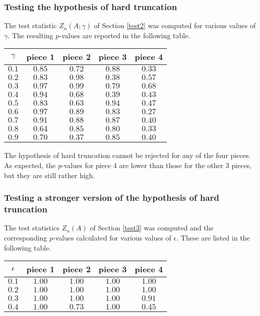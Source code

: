 \documentclass[11pt]{amsart}
\numberwithin{equation}{section}
\begin{document}
\subsubsection*{Testing the hypothesis of hard truncation}
The test statistic $Z_n(A;\gamma)$ of Section
\ref{test2}  was computed for various values of $\gamma$.
The resulting $p$-values are reported in the following table.
\begin{center}
\begin{tabular}{c|cccc}
$\gamma$&piece 1&piece 2&piece 3&piece 4\\
\hline
$0.1$&$0.85$&$0.72$&$0.88$&$0.33$\\
$0.2$&$0.83$&$0.98$&$0.38$&$0.57$\\
$0.3$&$0.97$&$0.99$&$0.79$&$0.68$\\
$0.4$&$0.94$&$0.68$&$0.39$&$0.43$\\
$0.5$&$0.83$&$0.63$&$0.94$&$0.47$\\
$0.6$&$0.97$&$0.89$&$0.83$&$0.27$\\
$0.7$&$0.91$&$0.88$&$0.87$&$0.40$\\
$0.8$&$0.64$&$0.85$&$0.80$&$0.33$\\
$0.9$&$0.70$&$0.37$&$0.85$&$0.40$
\end{tabular}
\end{center}
The hypothesis of hard truncation cannot be rejected for
any of the four pieces. As expected, the $p$-values for piece 4 are
lower than those for the other 3 pieces, but they are still rather
high. 

\subsubsection*{Testing  a stronger version of the hypothesis of hard
  truncation}

The test statistics $Z_n(A)$ of Section \ref{test3} was computed
and the corresponding $p$-values calculated for various values of
$\epsilon$. These are listed in the following table.
\begin{center}
\begin{tabular}{c|cccc}
$\epsilon$&piece 1&piece 2&piece 3&piece 4\\
\hline
$0.1$&$1.00$&$1.00$&$1.00$&$1.00$\\
$0.2$&$1.00$&$1.00$&$1.00$&$1.00$\\
$0.3$&$1.00$&$1.00$&$1.00$&$0.91$\\
$0.4$&$1.00$&$0.73$&$1.00$&$0.45$
\end{tabular}
\end{center}
\end{document}
